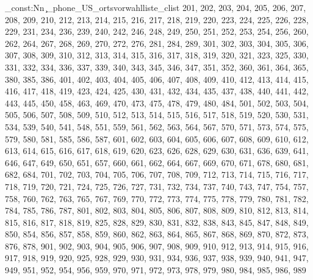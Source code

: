 \clist_const:Nn \c_phone_US_ortsvorwahlliste_clist {201,
202,
203,
204,
205,
206,
207,
208,
209,
210,
212,
213,
214,
215,
216,
217,
218,
219,
220,
223,
224,
225,
226,
228,
229,
231,
234,
236,
239,
240,
242,
246,
248,
249,
250,
251,
252,
253,
254,
256,
260,
262,
264,
267,
268,
269,
270,
272,
276,
281,
284,
289,
301,
302,
303,
304,
305,
306,
307,
308,
309,
310,
312,
313,
314,
315,
316,
317,
318,
319,
320,
321,
323,
325,
330,
331,
332,
334,
336,
337,
339,
340,
343,
345,
346,
347,
351,
352,
360,
361,
364,
365,
380,
385,
386,
401,
402,
403,
404,
405,
406,
407,
408,
409,
410,
412,
413,
414,
415,
416,
417,
418,
419,
423,
424,
425,
430,
431,
432,
434,
435,
437,
438,
440,
441,
442,
443,
445,
450,
458,
463,
469,
470,
473,
475,
478,
479,
480,
484,
501,
502,
503,
504,
505,
506,
507,
508,
509,
510,
512,
513,
514,
515,
516,
517,
518,
519,
520,
530,
531,
534,
539,
540,
541,
548,
551,
559,
561,
562,
563,
564,
567,
570,
571,
573,
574,
575,
579,
580,
581,
585,
586,
587,
601,
602,
603,
604,
605,
606,
607,
608,
609,
610,
612,
613,
614,
615,
616,
617,
618,
619,
620,
623,
626,
628,
629,
630,
631,
636,
639,
641,
646,
647,
649,
650,
651,
657,
660,
661,
662,
664,
667,
669,
670,
671,
678,
680,
681,
682,
684,
701,
702,
703,
704,
705,
706,
707,
708,
709,
712,
713,
714,
715,
716,
717,
718,
719,
720,
721,
724,
725,
726,
727,
731,
732,
734,
737,
740,
743,
747,
754,
757,
758,
760,
762,
763,
765,
767,
769,
770,
772,
773,
774,
775,
778,
779,
780,
781,
782,
784,
785,
786,
787,
801,
802,
803,
804,
805,
806,
807,
808,
809,
810,
812,
813,
814,
815,
816,
817,
818,
819,
825,
828,
829,
830,
831,
832,
838,
843,
845,
847,
848,
849,
850,
854,
856,
857,
858,
859,
860,
862,
863,
864,
865,
867,
868,
869,
870,
872,
873,
876,
878,
901,
902,
903,
904,
905,
906,
907,
908,
909,
910,
912,
913,
914,
915,
916,
917,
918,
919,
920,
925,
928,
929,
930,
931,
934,
936,
937,
938,
939,
940,
941,
947,
949,
951,
952,
954,
956,
959,
970,
971,
972,
973,
978,
979,
980,
984,
985,
986,
989}
